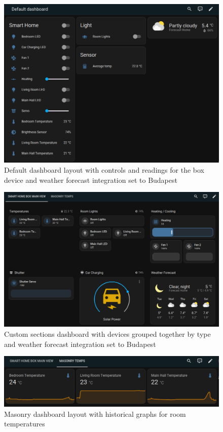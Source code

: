 \begin{figure}[!ht]
  \centering
  \includegraphics[width=150mm, keepaspectratio]{figures/homeassistant_dashboard_default.png}
  \caption{Default dashboard layout with controls and readings for the box device and weather forecast integration set to Budapest}
  \label{fig:HAdefaultDashboard}
\end{figure}

\begin{figure}[!ht]
  \centering
  \includegraphics[width=150mm, keepaspectratio]{figures/homeassistant_dashboard_custom.png}
  \caption{Custom sections dashboard with devices grouped together by type and weather forecast integration set to Budapest}
  \label{fig:HAcustomDashboard}
\end{figure}

\begin{figure}[!ht]
  \centering
  \includegraphics[width=150mm, keepaspectratio]{figures/homeassistant_dashboard_masonry.png}
  \caption{Masonry dashboard layout with historical graphs for room temperatures}
  \label{fig:HAmasonryDashboard}
\end{figure}

